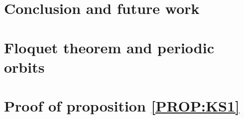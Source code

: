 

% 

\chapter{Conclusion and future work}
\label{chap:conc}




\appendix

\chapter{Floquet theorem and periodic orbits}
\label{sec:floq}



\chapter{Proof of proposition \ref{PROP:KS1} }
\label{chap:ksproof}



\begin{postliminary}
  \ifgatech               %
  \else
\printbibliography[heading=bibintoc,title={References}]
  \fi
  \ifgatech               %
  \begin{vita}
    
  \end{vita}
  \fi
\end{postliminary}


